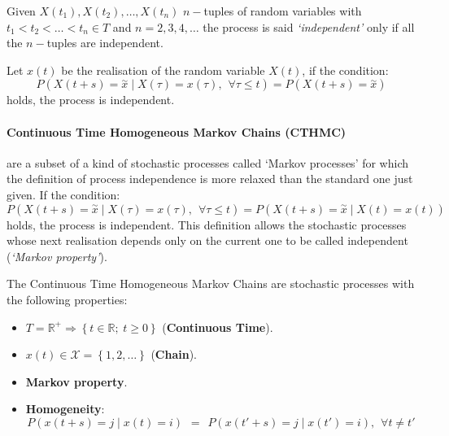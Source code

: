 \documentclass[12pt,a4paper]{article}
\begin{document}
\bigskip
\noindent 
Given $X(t_1), X(t_2),\dots, X(t_n)$ $n-$tuples of random variables with $t_1<t_2<\dots<t_n \in T$ and $n=2,3,4,\dots$ the process is said \emph{`independent'} only if all the $n-$tuples are independent. 

\bigskip
\noindent 
Let $x(t)$ be the realisation of the random variable $X(t)$, if the condition:
$$
P\left(X\left(t+s\right)=\overset{\sim}{x} \mid X\left(\tau\right)=
x\left(\tau\right),\hspace{5pt}\forall\tau\leq t\right)=
P\left(X\left(t+s\right)=\overset{\sim}{x} \right)
$$
holds, the process is independent.
\paragraph{Continuous Time Homogeneous Markov Chains (CTHMC)} are a subset of a kind of stochastic processes called `Markov processes' for which the definition of process independence is more relaxed than the standard one just given. If the condition:
$$
P\left(X\left(t+s\right)=\overset{\sim}{x} \mid X\left(\tau\right)=
x\left(\tau\right),\hspace{5pt}\forall\tau\leq t\right)=
P\left(X\left(t+s\right)=\overset{\sim}{x}  \mid  X\left(t\right)=x\left(t\right)\right)
$$
holds, the process is independent. This definition allows the stochastic processes whose next realisation depends only on the current one to be called independent (\emph{`Markov property'}).

\bigskip
\noindent
The Continuous Time Homogeneous Markov Chains are stochastic processes with the following properties:
\begin{itemize}
\item $T=\mathbb{R}^+\Rightarrow\left\lbrace t\in\mathbb{R};\hspace{3pt}t\geq 0\right\rbrace $ (\textbf{Continuous Time}).
\item $x(t)\in \mathcal{X}=\left\lbrace 1,2,\dots\right\rbrace$ (\textbf{Chain}).
\item \textbf{Markov property}.
\item \textbf{Homogeneity}: 
$$
P\left(x\left(t+s\right)=j \mid x\left(t\right)=i\right)
\hspace{5pt}=\hspace{5pt}
P\left(x\left(t'+s\right)=j \mid x\left(t'\right)=i\right),\hspace{5pt}\forall t\neq t'
$$
\end{itemize} 
\end{document}
